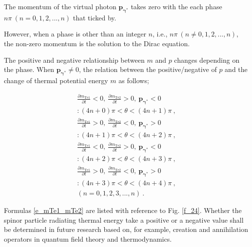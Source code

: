 \documentclass[%
 reprint,
 amsmath,amssymb,
 aps,
]{revtex4-1}
\numberwithin{equation}{section}%
\begin{document}
    The momentum of the virtual photon $ \bm{p_{\gamma^{*}}} $ takes zero with the each phase $ n \pi \ ( n = 0, 1, 2 ,..., n) $ that ticked by.


    However, when a phase is other than an integer $n$, i.e., $ n \pi \ ( n \neq 0, 1, 2 ,..., n) $, the non-zero momentum is the solution to the Dirac equation.

    The positive and negative relationship between $m$ and $p$ changes depending on the phase. When $\bm{p_{\gamma^{*}}} \neq 0$, the relation between the positive/negative of $p$ and the change of thermal potential energy $m$ as follows;


        \begin{equation}
            \begin{split}
                \frac{\partial m_{\mathrm{Te1}}}{\partial t} < 0 , \
                \frac{\partial m_{\mathrm{Te2}}}{\partial t} > 0 , \
                \bm{p_{\gamma^{*}}} < 0 \ \ \ \ \ \ \ \ \\
                : (4n+0) \pi < \theta < (4n+1)\pi \ , \\
                \frac{\partial m_{\mathrm{Te1}}}{\partial t} > 0 , \
                \frac{\partial m_{\mathrm{Te2}}}{\partial t} < 0 , \
                \bm{p_{\gamma^{*}}} > 0 \ \ \ \ \ \ \ \ \\
                : (4n+1)\pi < \theta < (4n+2)\pi \ , \\
                \frac{\partial m_{\mathrm{Te1}}}{\partial t} < 0 , \
                \frac{\partial m_{\mathrm{Te2}}}{\partial t} > 0 , \
                \bm{p_{\gamma^{*}}} < 0 \ \ \ \ \ \ \ \ \\
                : (4n+2)\pi < \theta < (4n+3)\pi \ , \\
                \frac{\partial m_{\mathrm{Te1}}}{\partial t} > 0 , \
                \frac{\partial m_{\mathrm{Te2}}}{\partial t} < 0 , \
                \bm{p_{\gamma^{*}}} > 0 \ \ \ \ \ \ \ \ \\
                : (4n+3)\pi < \theta < (4n+4)\pi \ , \\
                (n=0,1,2,3,...,n)
                \ .
            \end{split}
            \label{e_mTe1_mTe2}
        \end{equation}

    Formulas \ref{e_mTe1_mTe2} are listed with reference to Fig. \ref{f_24}. Whether the spinor particle radiating thermal energy take a positive or a negative value shall be determined in future research based on, for example, creation and annihilation operators in quantum field theory and thermodynamics.
    
\end{document}
